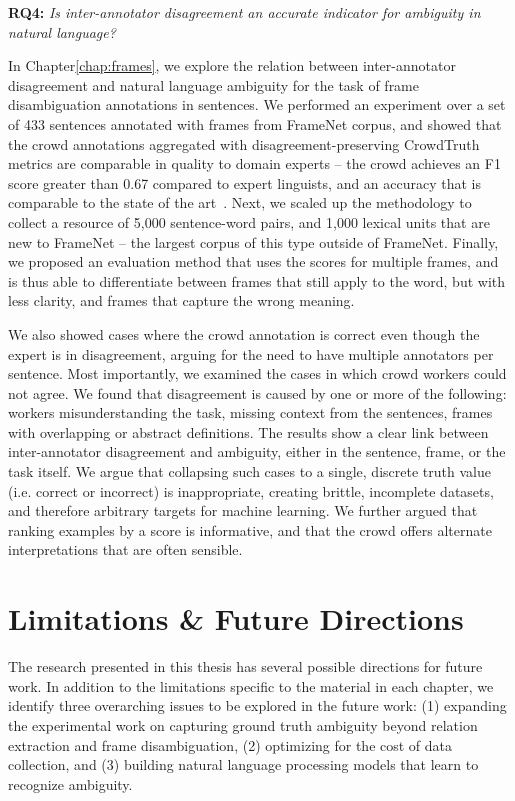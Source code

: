 \textbf{RQ4:} \textit{Is inter-annotator disagreement an accurate indicator for ambiguity in natural language?}

In Chapter\ref{chap:frames}, we explore the relation between inter-annotator disagreement and natural language ambiguity for the task of frame disambiguation annotations in sentences. We performed an experiment over a set of 433 sentences annotated with frames from FrameNet corpus, and showed that the crowd annotations aggregated with disagreement-preserving CrowdTruth metrics are comparable in quality to domain experts -- the crowd achieves an F1 score greater than 0.67 compared to expert linguists, and an accuracy that is comparable to the state of the art~\cite{Hong:2011:GCR:2018966.2018970}. Next, we scaled up the methodology to collect a resource of 5,000 sentence-word pairs, and 1,000 lexical units that are new to FrameNet -- the largest corpus of this type outside of FrameNet. Finally, we proposed an evaluation method that uses the scores for multiple frames, and is thus able to differentiate between frames that still apply to the word, but with less clarity, and frames that capture the wrong meaning.

We also showed cases where the crowd annotation is correct even though the expert is in disagreement, arguing for the need to have multiple annotators per sentence. Most importantly, we examined the cases in which crowd workers could not agree. We found that disagreement is caused by one or more of the following: workers misunderstanding the task, missing context from the sentences, frames with overlapping or abstract definitions. The results show a clear link between inter-annotator disagreement and ambiguity, either in the sentence, frame, or the task itself. We argue that collapsing such cases to a single, discrete truth value (i.e. correct or incorrect) is inappropriate, creating brittle, incomplete datasets, and therefore arbitrary targets for machine learning.  We further argued that ranking examples by a score is informative, and that the crowd offers alternate interpretations that are often sensible.


\section{Limitations \& Future Directions}

The research presented in this thesis has several possible directions for future work. In addition to the limitations specific to the material in each chapter, we identify three overarching issues to be explored in the future work: (1) expanding the experimental work on capturing ground truth ambiguity beyond relation extraction and frame disambiguation, (2) optimizing for the cost of data collection, and (3) building natural language processing models that learn to recognize ambiguity.


